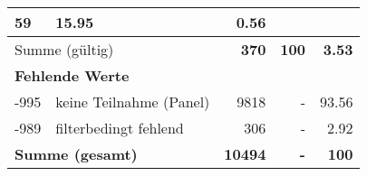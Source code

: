 \begin{longtable}{lXrrr}
       \num{59} &
       \num[round-mode=places,round-precision=2]{15.95} &
         \num[round-mode=places,round-precision=2]{0.56} \\
     \midrule
     \multicolumn{2}{l}{Summe (gültig)} &
       \textbf{\num{370}} &
     \textbf{\num{100}} &
       \textbf{\num[round-mode=places,round-precision=2]{3.53}} \\
     \multicolumn{5}{l}{\textbf{Fehlende Werte}}\\
       -995 &
       keine Teilnahme (Panel) &
         \num{9818} &
        - &
         \num[round-mode=places,round-precision=2]{93.56} \\
       -989 &
       filterbedingt fehlend &
         \num{306} &
        - &
         \num[round-mode=places,round-precision=2]{2.92} \\
     \midrule
     \multicolumn{2}{l}{\textbf{Summe (gesamt)}} &
          \textbf{\num{10494}} &
        \textbf{-} &
        \textbf{\num{100}} \\
     \bottomrule
     \end{longtable}
     
